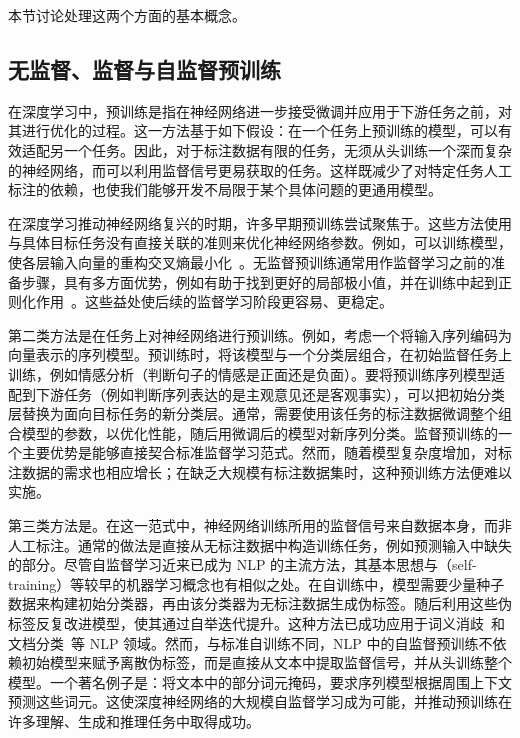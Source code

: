 本节讨论处理这两个方面的基本概念。

\subsection{无监督、监督与自监督预训练}

\noindent 在深度学习中，预训练是指在神经网络进一步接受微调并应用于下游任务之前，对其进行优化的过程。这一方法基于如下假设：在一个任务上预训练的模型，可以有效适配另一个任务。因此，对于标注数据有限的任务，无须从头训练一个深而复杂的神经网络，而可以利用监督信号更易获取的任务。这样既减少了对特定任务人工标注的依赖，也使我们能够开发不局限于某个具体问题的更通用模型。

在深度学习推动神经网络复兴的时期，许多早期预训练尝试聚焦于。这些方法使用与具体目标任务没有直接关联的准则来优化神经网络参数。例如，可以训练模型，使各层输入向量的重构交叉熵最小化~\cite{bengio-etal:2006greedy}。无监督预训练通常用作监督学习之前的准备步骤，具有多方面优势，例如有助于找到更好的局部极小值，并在训练中起到正则化作用~\cite{erhan-etal:2010does}。这些益处使后续的监督学习阶段更容易、更稳定。

第二类方法是在任务上对神经网络进行预训练。例如，考虑一个将输入序列编码为向量表示的序列模型。预训练时，将该模型与一个分类层组合，在初始监督任务上训练，例如情感分析（判断句子的情感是正面还是负面）。要将预训练序列模型适配到下游任务（例如判断序列表达的是主观意见还是客观事实），可以把初始分类层替换为面向目标任务的新分类层。通常，需要使用该任务的标注数据微调整个组合模型的参数，以优化性能，随后用微调后的模型对新序列分类。监督预训练的一个主要优势是能够直接契合标准监督学习范式。然而，随着模型复杂度增加，对标注数据的需求也相应增长；在缺乏大规模有标注数据集时，这种预训练方法便难以实施。

第三类方法是。在这一范式中，神经网络训练所用的监督信号来自数据本身，而非人工标注。通常的做法是直接从无标注数据中构造训练任务，例如预测输入中缺失的部分。尽管自监督学习近来已成为 NLP 的主流方法，其基本思想与（self-training）等较早的机器学习概念也有相似之处。在自训练中，模型需要少量种子数据来构建初始分类器，再由该分类器为无标注数据生成伪标签。随后利用这些伪标签反复改进模型，使其通过自举迭代提升。这种方法已成功应用于词义消歧~\cite{yarowsky:1995unsupervised}和文档分类~\cite{blum-and-tom:1998combining}等 NLP 领域。然而，与标准自训练不同，NLP 中的自监督预训练不依赖初始模型来赋予离散伪标签，而是直接从文本中提取监督信号，并从头训练整个模型。一个著名例子是：将文本中的部分词元掩码，要求序列模型根据周围上下文预测这些词元。这使深度神经网络的大规模自监督学习成为可能，并推动预训练在许多理解、生成和推理任务中取得成功。

